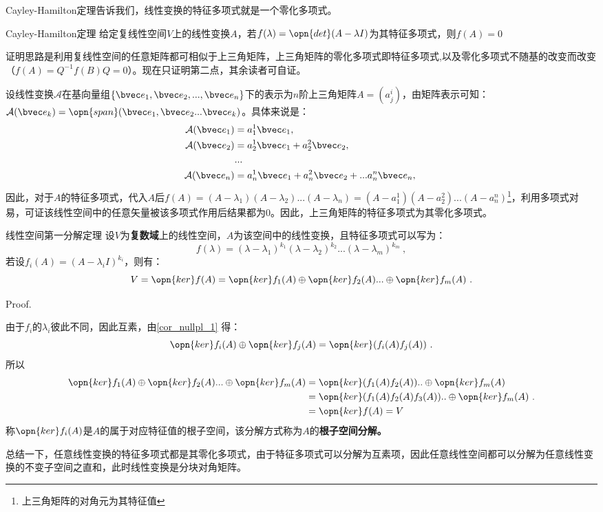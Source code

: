 Cayley-Hamilton定理告诉我们，线性变换的特征多项式就是一个零化多项式。
\begin{theorem}{Cayley-Hamilton定理}
给定复线性空间$V$上的线性变换$A$，若$f(\lambda)=\opn{det}(A-\lambda I)$为其特征多项式，则$f(A)=0$
\end{theorem}
证明思路是利用复线性空间的任意矩阵都可相似于上三角矩阵，上三角矩阵的零化多项式即特征多项式,以及零化多项式不随基的改变而改变（$f(A)=Q^{-1}f(B)Q=0$）。现在只证明第二点，其余读者可自证。

设线性变换$\mathcal A$在基向量组$\{\bvec e_1,\bvec e_2,...,\bvec e_n\}$下的表示为$n$阶上三角矩阵$A=(a^i_j)$，由矩阵表示可知：$\mathcal A(\bvec e_k)=\opn{span}(\bvec e_1,\bvec e_2...\bvec e_k)$。具体来说是：
\begin{equation}
\begin{aligned}
\mathcal A(\bvec e_1)&=a^1_1 \bvec e_1,\\
\mathcal A(\bvec e_2)&=a^1_2 \bvec e_1+a^2_2\bvec e_2,\\
&...\\
\mathcal A(\bvec e_n)&=a^1_n \bvec e_1+a^2_n\bvec e_2+...a^n_n\bvec e_n,\\
\end{aligned}~
\end{equation}
因此，对于$A$的特征多项式，代入$A$后$f(A)=(A-\lambda_1)(A-\lambda_2)...(A-\lambda_n)=(A-a^1_1)(A-a^2_2)...(A-a^n_n)$\footnote{上三角矩阵的对角元为其特征值}，利用多项式对易，可证该线性空间中的任意矢量被该多项式作用后结果都为$0$。因此，上三角矩阵的特征多项式为其零化多项式。
\begin{theorem}{线性空间第一分解定理}\label{the_nullpl_1}
设$V$为\textbf{复数域}上的线性空间，$A$为该空间中的线性变换，且特征多项式可以写为：
\begin{equation}
f(\lambda)=(\lambda-\lambda_1)^{k_1}(\lambda-\lambda_2)^{k_2}...(\lambda-\lambda_m)^{k_m}~,
\end{equation}
若设$f_i(A)=(A-\lambda_iI)^{k_i}$，则有：
\begin{equation}
V=\opn{ker}f(A)=\opn{ker}f_1(A)\oplus\opn{ker}f_2(A)...\oplus\opn{ker}f_m(A)~.
\end{equation}
\end{theorem}
Proof.

由于$f_i$的$\lambda_i$彼此不同，因此互素，由\autoref{cor_nullpl_1} 得：
\begin{equation}
\opn{ker}f_i(A)\oplus \opn{ker}f_j(A)=\opn{ker}(f_i(A)f_j(A))~.
\end{equation}
所以
\begin{equation}
\begin{aligned}
\opn{ker}f_1(A)\oplus\opn{ker}f_2(A)...\oplus\opn{ker}f_m(A)&=\opn{ker}(f_1(A)f_2(A))..\oplus\opn{ker}f_m(A)\\
&=\opn{ker}(f_1(A)f_2(A)f_3(A))..\oplus\opn{ker}f_m(A)\\
&=\opn{ker}f(A)=V
\end{aligned}
~.
\end{equation}
称$\opn{ker}f_i(A)$是$A$的属于对应特征值的根子空间，该分解方式称为$A$的\textbf{根子空间分解。}

总结一下，任意线性变换的特征多项式都是其零化多项式，由于特征多项式可以分解为互素项，因此任意线性空间都可以分解为任意线性变换的不变子空间之直和，此时线性变换是分块对角矩阵。

